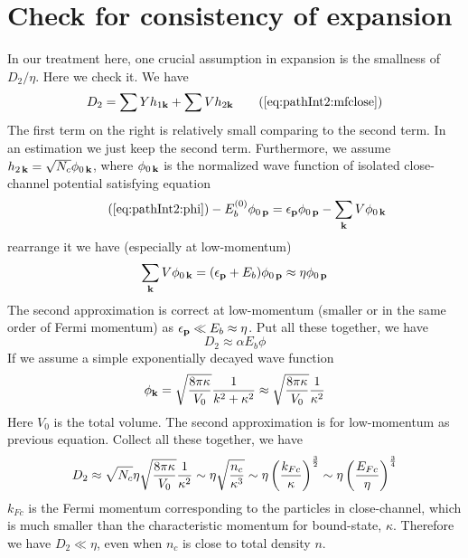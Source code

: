 \section{Check for consistency of expansion\label{sec:pathApp:consistency}}
In our treatment here, one crucial assumption in expansion is the smallness of $D_{2}/\eta$.  Here we check it.  We have 
\begin{equation}
D_{2}=\sum{}Yh_{1\vk}+\sum{}Vh_{2\vk}\tag{\ref{eq:pathInt2:mfclose}}
\end{equation}
The first term on the right is relatively small comparing to the second term.  In an estimation we just keep the second term.  Furthermore,  we assume $h_{2\,\mathbf{k}}=\sqrt{N_{c}}\phi_{0\,\mathbf{k}}$, where $\phi_{0\,\mathbf{k}}$ is the normalized wave function of isolated close-channel potential satisfying \sch equation
\begin{equation}\tag{\ref{eq:pathInt2:phi}}
-E_{b}^{(0)}\phi_{0\,\vp}=\epsilon_{\vp}\phi_{0\,\vp}-\sum_{\vk}V \phi_{0\,\vk}
\end{equation}
rearrange it we have (especially at low-momentum)
\begin{equation*}
\sum_{\mathbf{k}}V \phi_{0\,\mathbf{k}}=(\epsilon_{\mathbf{p}}+E_{b})\phi_{0\,\mathbf{p}}\approx{\eta}\phi_{0\,\mathbf{p}}
\end{equation*}
The second approximation is correct at low-momentum (smaller or in the same order of Fermi momentum) as $\epsilon_{\mathbf{p}}\ll{}E_{b}\approx\eta$.  Put all these together, we have
\begin{equation*}
D_{2}\approx\alpha{}E_{b}\phi
\end{equation*}
If we assume a simple exponentially decayed wave function
\begin{equation*}
\phi_{\mathbf{k}}=\sqrt{\frac{8\pi\kappa}{V_{0}}}\frac{1}{k^{2}+\kappa^{2}}\approx\sqrt{\frac{8\pi\kappa}{V_{0}}}\frac{1}{\kappa^{2}}
\end{equation*}
Here  $V_{0}$ is the total volume.  The second approximation is for low-momentum as previous equation.  Collect all these together, we have
\begin{equation}
D_{2}\approx\sqrt{N_{c}}\eta\sqrt{\frac{8\pi\kappa}{V_{0}}}\frac{1}{\kappa^{2}}
\sim\eta\sqrt\frac{n_{c}}{\kappa^{3}}
\sim\eta\left(\frac{k_{Fc}}{\kappa}\right)^{\frac{3}{2}}
\sim\eta\left(\frac{E_{Fc}}{\eta}\right)^{\frac{3}{4}}
\end{equation}
$k_{Fc}$ is the Fermi momentum corresponding to the particles in close-channel, which is much smaller than the characteristic momentum for bound-state, $\kappa$.   Therefore we have $D_{2}\ll\eta$, even when $n_{c}$ is close to total density $n$. 

